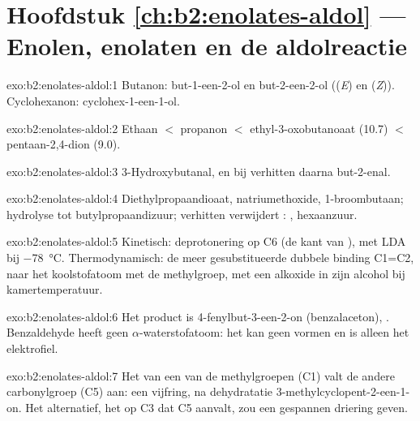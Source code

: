 \section*{Hoofdstuk \ref{ch:b2:enolates-aldol} --- Enolen, enolaten en de aldolreactie}

\begin{solution}{exo:b2:enolates-aldol:1}
Butanon: but-1-een-2-ol  en but-2-een-2-ol  ((\textit{E}) en
(\textit{Z})). Cyclohexanon: cyclohex-1-een-1-ol.
\end{solution}

\begin{solution}{exo:b2:enolates-aldol:2}
Ethaan $<$ propanon $<$ ethyl-3-oxobutanoaat (10.7) $<$ pentaan-2,4-dion (9.0).
\end{solution}

\begin{solution}{exo:b2:enolates-aldol:3}
3-Hydroxybutanal, en bij verhitten daarna but-2-enal.
\end{solution}

\begin{solution}{exo:b2:enolates-aldol:4}
Diethylpropaandioaat, natriumethoxide, 1-broombutaan; hydrolyse tot butylpropaandizuur;
verhitten verwijdert : , hexaanzuur.
\end{solution}

\begin{solution}{exo:b2:enolates-aldol:5}
Kinetisch: deprotonering op C6 (de kant van ), met LDA bij \qty{-78}{\degreeCelsius}. Thermodynamisch:
de meer gesubstitueerde dubbele binding C1=C2, naar het koolstofatoom met de methylgroep, met een alkoxide in zijn
alcohol bij kamertemperatuur.
\end{solution}

\begin{solution}{exo:b2:enolates-aldol:6}
Het product is 4-fenylbut-3-een-2-on (benzalaceton), . Benzaldehyde heeft geen $\alpha$-waterstofatoom: het
kan geen  vormen en is alleen het elektrofiel.
\end{solution}

\begin{solution}{exo:b2:enolates-aldol:7}
Het  van een van de methylgroepen (C1) valt de andere carbonylgroep (C5) aan: een vijfring,
na dehydratatie 3-methylcyclopent-2-een-1-on. Het alternatief, het  op C3 dat C5 aanvalt,
zou een gespannen driering geven.
\end{solution}

